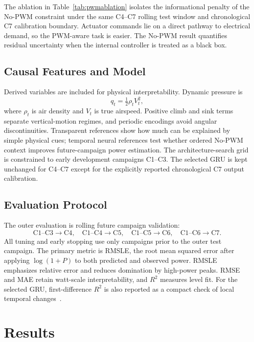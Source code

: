 \documentclass[runningheads,a4paper]{llncs}
\begin{document}
The ablation in Table~\ref{tab:pwmablation} isolates the informational penalty of the No-PWM constraint under the same C4--C7 rolling test window and chronological C7 calibration boundary. Actuator commands lie on a direct pathway to electrical demand, so the PWM-aware task is easier. The No-PWM result quantifies residual uncertainty when the internal controller is treated as a black box.

\subsection{Causal Features and Model}

Derived variables are included for physical interpretability. Dynamic pressure is
\begin{equation}
  q_t = \tfrac{1}{2}\rho_t V_t^2,
  \label{eq:q}
\end{equation}
where $\rho_t$ is air density and $V_t$ is true airspeed. Positive climb and sink terms separate vertical-motion regimes, and periodic encodings avoid angular discontinuities. Transparent references show how much can be explained by simple physical cues; temporal neural references test whether ordered No-PWM context improves future-campaign power estimation. The architecture-search grid is constrained to early development campaigns C1--C3. The selected GRU is kept unchanged for C4--C7 except for the explicitly reported chronological C7 output calibration.

\subsection{Evaluation Protocol}

The outer evaluation is rolling future campaign validation:
\[
  \text{C1--C3}\to\text{C4},\quad
  \text{C1--C4}\to\text{C5},\quad
  \text{C1--C5}\to\text{C6},\quad
  \text{C1--C6}\to\text{C7}.
\]
All tuning and early stopping use only campaigns prior to the outer test campaign. The primary metric is RMSLE, the root mean squared error after applying $\log(1+P)$ to both predicted and observed power. RMSLE emphasizes relative error and reduces domination by high-power peaks. RMSE and MAE retain watt-scale interpretability, and $R^2$ measures level fit. For the selected GRU, first-difference $R^2$ is also reported as a compact check of local temporal changes~\cite{hyndman2006forecast}.

\section{Results}
\end{document}
